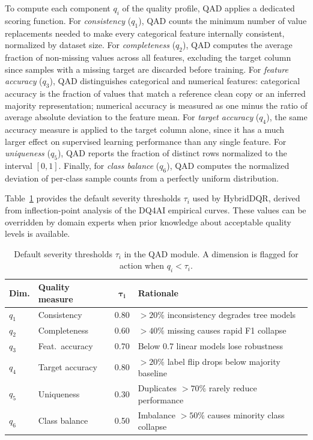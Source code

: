 \documentclass[runningheads]{llncs}
\begin{document}
To compute each component $q_i$ of the quality profile, QAD
applies a dedicated scoring function.
For \emph{consistency} ($q_1$), QAD counts the minimum number of
value replacements needed to make every categorical feature
internally consistent, normalized by dataset size.
For \emph{completeness} ($q_2$), QAD computes the average
fraction of non-missing values across all features, excluding the
target column since samples with a missing target are discarded
before training.
For \emph{feature accuracy} ($q_3$), QAD distinguishes categorical
and numerical features: categorical accuracy is the fraction of
values that match a reference clean copy or an inferred majority
representation; numerical accuracy is measured as one minus the
ratio of average absolute deviation to the feature mean.
For \emph{target accuracy} ($q_4$), the same accuracy measure is
applied to the target column alone, since it has a much larger
effect on supervised learning performance than any single feature.
For \emph{uniqueness} ($q_5$), QAD reports the fraction of
distinct rows normalized to the interval $[0, 1]$.
Finally, for \emph{class balance} ($q_6$), QAD computes the
normalized deviation of per-class sample counts from a perfectly
uniform distribution.

Table~\ref{tab:qad-defaults} provides the default severity
thresholds $\tau_i$ used by HybridDQR, derived from
inflection-point analysis of the DQ4AI empirical curves.
These values can be overridden by domain experts when prior
knowledge about acceptable quality levels is available.

\begin{table}[t]
\centering
\caption{Default severity thresholds $\tau_i$ in the QAD module.
A dimension is flagged for action when $q_i < \tau_i$.}
\label{tab:qad-defaults}
\small
\begin{tabular}{@{}llcp{4.2cm}@{}}
\toprule
\textbf{Dim.} & \textbf{Quality measure} & $\boldsymbol{\tau_i}$ & \textbf{Rationale} \\
\midrule
$q_1$ & Consistency     & 0.80 & ${>}20\%$ inconsistency degrades tree models \\
$q_2$ & Completeness    & 0.60 & ${>}40\%$ missing causes rapid F1 collapse \\
$q_3$ & Feat.\ accuracy & 0.70 & Below 0.7 linear models lose robustness \\
$q_4$ & Target accuracy & 0.80 & ${>}20\%$ label flip drops below majority baseline \\
$q_5$ & Uniqueness      & 0.30 & Duplicates ${>}70\%$ rarely reduce performance \\
$q_6$ & Class balance   & 0.50 & Imbalance ${>}50\%$ causes minority class collapse \\
\bottomrule
\end{tabular}
\end{table}
\end{document}

